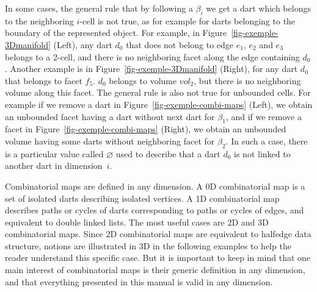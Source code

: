 In some cases, the general rule that by following a $\beta_i$ we get a
dart which belongs to the neighboring $i$-cell is not true, as for example
for darts belonging to the boundary of the represented
object. For example, in Figure~\ref{fig-exemple-3Dmanifold} (Left), any dart
$d_0$ that does not belong to edge $e_1$, $e_2$ and $e_3$
belongs to a 2-cell, and there is no neighboring facet along the edge containing $d_0$.
Another example is in Figure~\ref{fig-exemple-3Dmanifold} (Right), for
any dart $d_0$ that belongs to facet $f_5$.
$d_0$ belongs to volume $vol_2$, but there is no neighboring volume
along this facet.  The general rule is also not true for unbounded
cells. For example if we remove a dart in
Figure~\ref{fig-exemple-combi-maps} (Left), we obtain an unbounded
facet having a dart without next dart for $\beta_1$, and if we remove
a facet in Figure~\ref{fig-exemple-combi-maps} (Right), we obtain an
unbounded volume having some darts without neighboring facet for
$\beta_2$.  In such a case, there is a particular value called
$\varnothing$ used to describe that a dart $d_0$ is not linked to
another dart in dimension~$i$.


Combinatorial maps are defined in any dimension. A 0D combinatorial
map is a set of isolated darts describing isolated vertices. A 1D
combinatorial map describes paths or cycles of darts corresponding to
paths or cycles of edges, and equivalent to double linked lists.  The
most useful cases are 2D and 3D combinatorial maps. Since 2D
combinatorial maps are equivalent to halfedge data structure, notions
are illustrated in 3D in the following examples to help the reader 
understand this specific case. But it is important to keep in mind
that one main interest of combinatorial maps is their generic
definition in any dimension, and that everything presented in this
manual is valid in any dimension.

